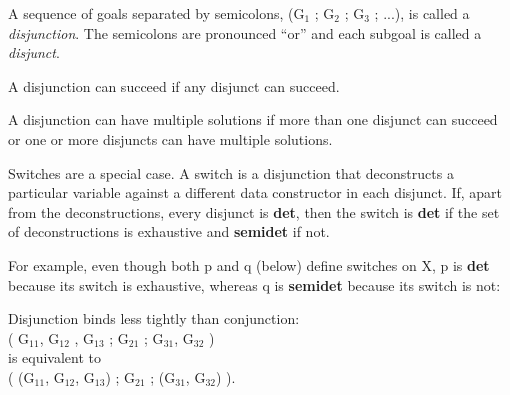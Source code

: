 \documentclass[a4paper,11pt,notitlepage,onecolumn]{book}
\begin{document}
A sequence of goals separated by semicolons, \textsf{(G$_{1}$ ; G$_{2}$ ; G$_{3}$ ; ...)}, is
called a \emph{disjunction}.  The semicolons are pronounced ``or'' and each
subgoal is called a \emph{disjunct}.

A disjunction can succeed if any disjunct can succeed.

A disjunction can have multiple solutions if more than one disjunct can
succeed or one or more disjuncts can have multiple solutions.

\Note Switches are a special case.  A switch is a disjunction that
deconstructs a particular variable against a different data constructor in
each disjunct.  If, apart from the deconstructions, every disjunct is \textsf{\textbf{det}},
then the switch is \textsf{\textbf{det}} if the set of deconstructions is exhaustive and
\textsf{\textbf{semidet}} if not.

For example, even though both \textsf{p} and \textsf{q} (below) define switches on \textsf{X},
\textsf{p} is \textsf{\textbf{det}} because its switch is exhaustive, whereas \textsf{q} is \textsf{\textbf{semidet}}
because its switch is not:
\begin{small}

\begin{ptabular}
\nextline
\nextline
{}
\nextline
{}
\nextline
\nextline
{}
\nextline
{}
\nextline
\end{ptabular}

\end{small}

\Note Disjunction binds less tightly than conjunction:
\\\textsf{( G$_{11}$, G$_{12}$ , G$_{13}$ ; G$_{21}$ ; G$_{31}$, G$_{32}$ )}
\\is equivalent to
\\\textsf{( (G$_{11}$, G$_{12}$, G$_{13}$) ; G$_{21}$ ; (G$_{31}$, G$_{32}$) )}.
\end{document}
